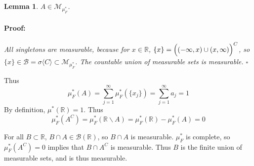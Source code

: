 \documentclass{article}
\newenvironment{proof}{\paragraph{Proof:}}{\hfill$\square$}
\newtheorem{lemma}[theorem]{Lemma}
\newcommand{\R}{\mathbb{R}}
\newcommand{\M}{\mathcal{M}}
\newcommand{\B}{\mathcal{B}}
\begin{document}
\begin{lemma}
$A \in \M_{\mu_F^*}$.
\begin{proof}
All singletons are measurable, because for $x \in \R$, $\{x\} = \Bigl( (-\infty, x) \cup (x, \infty) \Bigr)^C$, so $\{x\} \in \B = \sigma\langle C \rangle \subset \M_{\mu_F^*}$. The countable union of measurable sets is measurable.
\end{proof}
\end{lemma}

Thus
\[
\mu^*_F(A) = \sum_{j=1}^\infty \mu^*_F(\{x_j\}) = \sum_{j=1}^\infty a_j = 1
\]
By definition, $\mu^*(\R) = 1$. Thus
\[
\mu^*_F(A^C) = \mu^*_F(\R \backslash A) = \mu^*_F(\R) - \mu^*_F(A) = 0
\]

For all $B \subset \R$, $B \cap A \in \B(\R)$, so $B \cap A$ is measurable. $\mu^*_F$ is complete, so $\mu^*_F(A^C) = 0$ implies that $B \cap A^C$ is measurable. Thus $B$ is the finite union of measurable sets, and is thus measurable.
\end{document}
